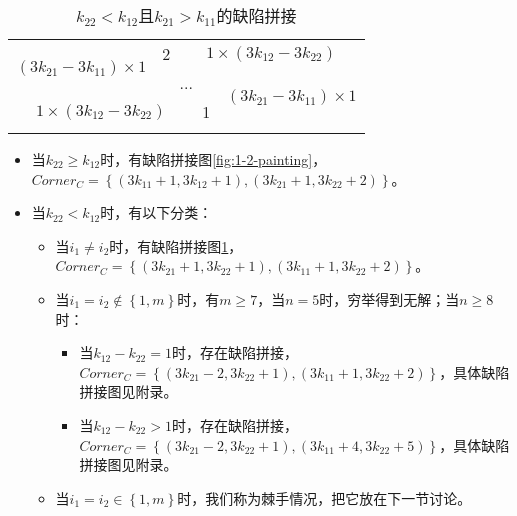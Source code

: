 \begin{table}[htbp]
	\centering
	\caption{$k_{22} < k_{12}$且$k_{21} > k_{11}$的缺陷拼接}
	\begin{tabular}{|cc|ccc|cc|}
		\hline
		\multicolumn{2}{|c|}{\multirow{3}{*}{$(3k_{21} - 3k_{11}) \times 1$}} & 2 & \multicolumn{4}{|c|}{$1 \times  (3k_{12} - 3k_{22})$}                                                                                 \\
		\cline{3-7}
		                                                                      &   & \multicolumn{3}{c}{\multirow{2}{*}{...}}              & \multicolumn{2}{|c|}{\multirow{3}{*}{$(3k_{21} - 3k_{11}) \times 1$}}         \\
		                                                                      &   &                                                       &                                                                       &  &  & \\
		\cline{1-5}
		\multicolumn{4}{|c|}{$1 \times  (3k_{12} - 3k_{22})$}                 & 1 &                                                       &                                                                               \\
		\hline
		\label{fig:2-1-painting-1}
	\end{tabular}
\end{table}

\begin{itemize}
	\item 当$k_{22} \ge k_{12}$时，有缺陷拼接图\ref*{fig:1-2-painting}，\\
	      $Corner_C = \left\{(3k_{11} + 1, 3k_{12} + 1), (3k_{21} + 1, 3k_{22} + 2)\right\}$。
	\item 当$k_{22} < k_{12}$时，有以下分类：
	      \begin{itemize}
		      \item 当$i_1 \neq i_2$时，有缺陷拼接图\ref*{fig:2-1-painting-1}，\\
		            $Corner_C = \left\{(3k_{21} + 1, 3k_{22} + 1), (3k_{11} + 1, 3k_{22} + 2)\right\}$。
		      \item 当$i_1 = i_2 \notin \left\{1, m\right\}$时，有$m \ge 7$，当$n = 5$时，穷举得到无解；当$n \ge 8$时：
		            \begin{itemize}
			            \item 当$k_{12} - k_{22} = 1$时，存在缺陷拼接，\\
			                  $Corner_C = \left\{(3k_{21} - 2, 3k_{22} + 1), (3k_{11} + 1, 3k_{22} + 2)\right\}$，具体缺陷拼接图见附录。
			            \item 当$k_{12} - k_{22} > 1$时，存在缺陷拼接，\\
			                  $Corner_C = \left\{(3k_{21} - 2, 3k_{22} + 1), (3k_{11} + 4, 3k_{22} + 5)\right\}$，具体缺陷拼接图见附录。
		            \end{itemize}
		      \item 当$i_1 = i_2 \in \left\{1, m\right\}$时，我们称为棘手情况，把它放在下一节讨论。
	      \end{itemize}
\end{itemize}


